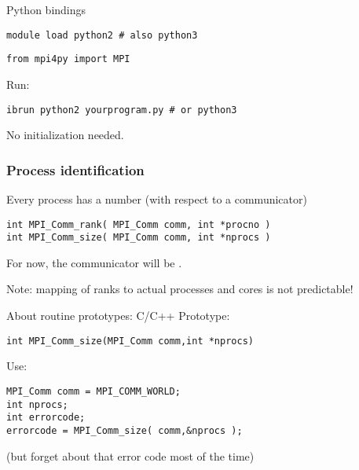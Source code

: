 \begin{tacc}
\begin{frame}[containsverbatim]{Python bindings}
\begin{verbatim}
module load python2 # also python3
\end{verbatim}
\begin{verbatim}
from mpi4py import MPI
\end{verbatim}
Run:
\begin{verbatim}
ibrun python2 yourprogram.py # or python3
\end{verbatim}
  No initialization needed.
\end{frame}
\end{tacc}

\begin{exerciseframe}[hello]
  
\end{exerciseframe}

\begin{frame}[containsverbatim]\frametitle{Process identification}
Every process has a number (with respect to a communicator)
\lstset{language=C}
\begin{lstlisting}
int MPI_Comm_rank( MPI_Comm comm, int *procno )
int MPI_Comm_size( MPI_Comm comm, int *nprocs )
\end{lstlisting}
For now, the communicator will be .

Note: mapping of ranks to actual processes and cores is not predictable!
\end{frame}

\begin{frame}[containsverbatim]{About routine prototypes: C/C++}
  \label{sec:protos}
Prototype:
\lstset{language=C}
\begin{lstlisting}
int MPI_Comm_size(MPI_Comm comm,int *nprocs)
\end{lstlisting}
Use:
\lstset{language=C}
\begin{lstlisting}
MPI_Comm comm = MPI_COMM_WORLD;
int nprocs;
int errorcode;
errorcode = MPI_Comm_size( comm,&nprocs );
\end{lstlisting}
(but forget about that error code most of the time)
\end{frame}

